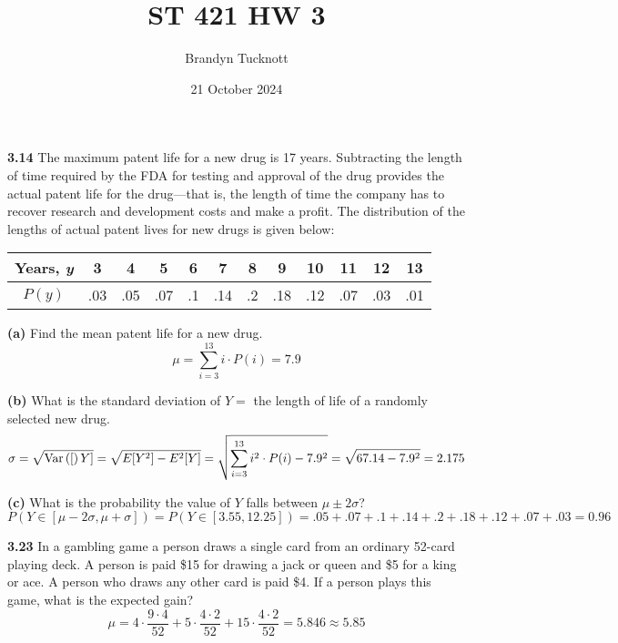 \documentclass{exam}
\title{ST 421 HW 3}
\author{Brandyn Tucknott}
\date{21 October 2024}
\begin{document}
\maketitle

\begin{questions}
    \textbf{3.14 }
The maximum patent life for a new drug is 17 years. Subtracting the length of time required by the FDA for testing and approval of the drug provides the actual patent life for the drug---that is, the length of time the company has to recover research and development costs and make a profit. The distribution of the lengths of actual patent lives for new drugs is given below:

\newline
\newline

\begin{tabular}{c|ccccccccccc}
     Years, \textit{y} & 3 & 4 & 5 & 6 & 7 & 8 & 9 & 10 & 11 & 12 & 13 \\
     \hline
     $P(y)$ & .03 & .05& .07 & .1& .14 & .2 & .18 & .12 & .07 & .03 & .01
\end{tabular}

\newline
\newline

\textbf{(a) } Find the mean patent life for a new drug.
\sol
$$\mu = \sum_{i = 3}^{13} i \cdot P(i) = 7.9$$



\textbf{(b) } What is the standard deviation of $Y =$ the length of life of a randomly selected new drug.
\sol
$$\sigma = \sqrt{\text{Var}\left( [ \right)Y]} = \sqrt{E[Y^2] - E^2[Y]} = \sqrt{\sum_{i = 3}^{13} i^2 \cdot P(i) - 7.9^2} = \sqrt{67.14 - 7.9^2} = 2.175$$



\textbf{(c) } What is the probability the value of $Y$ falls between $\mu \pm 2 \sigma$?
\sol
$P(Y \in [\mu - 2\sigma, \mu + \sigma]) = P(Y \in [3.55, 12.25]) = .05+ .07 + .1+ .14 + .2 + .18 + .12 + .07 + .03 = 0.96$




\newpage
\textbf{3.23 }
In a gambling game a person draws a single card from an ordinary 52-card playing deck. A person is paid \$15 for drawing a jack or queen and \$5 for a king or ace. A person who draws any other card is paid \$4. If a person plays this game, what is the expected gain?
\sol
$$\mu = 4 \cdot \frac{9 \cdot 4}{52} + 5 \cdot \frac{4 \cdot 2}{52} + 15 \cdot \frac{4 \cdot 2}{52} = 5.846 \approx 5.85$$


\end{questions}
\end{document}

